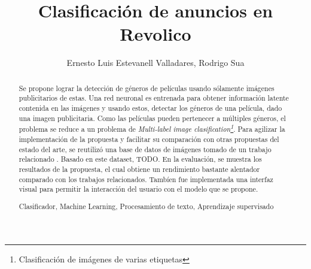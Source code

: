 \documentclass[runningheads,a4paper]{llncs}
\newcommand{\keywords}[1]{\par\addvspace\baselineskip
\noindent\keywordname\enspace\ignorespaces#1}
\begin{document}
\mainmatter  %

\title{Clasificaci\'on de anuncios en Revolico}


%
%
\author{Ernesto Luis Estevanell Valladares, Rodrigo Sua}
%


%
%

\maketitle


\begin{abstract}

Se propone lograr la detecci\'on de g\'eneros de pel\'iculas usando s\'olamente im\'agenes publicitarios de estas. Una red neuronal es entrenada para obtener informaci\'on latente contenida en las im\'agenes y usando estos, detectar  los g\'eneros de una pel\'icula, dado una imagen publicitaria. Como las pel\'iculas pueden pertenecer a m\'ultiples g\'eneros, el problema se reduce a un problema de \textit{Multi-label image clasification\footnote{Clasificaci\'on de im\'agenes de varias etiquetas}}. Para agilizar la implementaci\'on de la propuesta y facilitar su comparaci\'on con otras propuestas del estado del arte, se reutiliz\'o una base de datos de im\'agenes tomado de un trabajo relacionado \cite{weitachu}. Basado en este dataset, {TODO}. En la evaluaci\'on, se muestra los resultados de la propuesta, el cual obtiene un rendimiento bastante alentador comparado con los trabajos relacionados. Tamb\'ien fue implementada una interfaz visual para permitir la interacci\'on del usuario con el modelo que se propone.

\keywords{Clasificador, Machine Learning, Procesamiento de texto, Aprendizaje supervisado}
\end{abstract}
\end{document}
